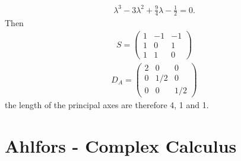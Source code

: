 \documentclass[10pt,a4paper]{book}
\theoremstyle{definition}
\begin{document}
\begin{align}
    \lambda^3-3\lambda^2+\frac{9}{4}\lambda-\frac{1}{2}=0.
\end{align}
Then
\begin{align}
S=\begin{pmatrix}
1 & -1&-1\\
1 & 0 & 1\\
1 & 1 & 0
\end{pmatrix}
\end{align}
\begin{align}
D_A=\begin{pmatrix}
2 & 0   & 0\\
0 & 1/2 & 0\\
0 & 0   & 1/2
\end{pmatrix}
\end{align}
the length of the principal axes are therefore 4, 1 and 1.

\newpage
\section{{\sc Ahlfors} - Complex Calculus}
\end{document}
